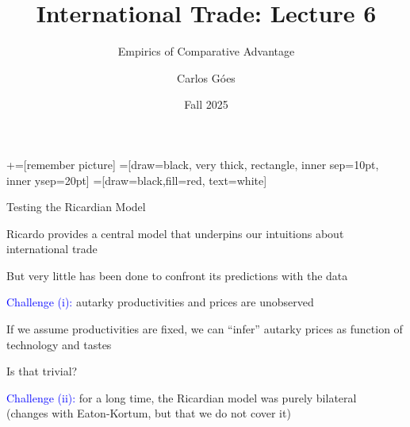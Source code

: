 \documentclass[notes,11pt, aspectratio=169, xcolor=table]{beamer}
\title[]{International Trade: Lecture 6}
\subtitle[]{Empirics of Comparative Advantage}
\author[Góes]
{Carlos Góes\inst{1}}
\date{Fall 2025}
\institute[GWU]{\inst{1} George Washington University }
\newcommand{\blue}[1]{\textcolor{blue}{#1}}
\newenvironment{wideitemize}{\itemize\addtolength{\itemsep}{10pt}}{\enditemize}
\begin{document}
\newcommand\marktopleft[1]{%
    \tikz[overlay,remember picture] 
        \node (marker-#1-a) at (-.3em,.3em) {};%
}
\newcommand\markbottomright[2]{%
    \tikz[overlay,remember picture] 
        \node (marker-#1-b) at (0em,0em) {};%
}
+=[remember picture] 
 =[draw=black, very thick, rectangle, inner sep=10pt, inner ysep=20pt]
 =[draw=black,fill=red, text=white]















\frame{\titlepage}
\addtocounter{framenumber}{-1}





\begin{frame}{Testing the Ricardian Model}
    \begin{wideitemize}
        \item Ricardo provides a central model that underpins our intuitions about international trade

        \item<2-> But very little has been done to confront its predictions with the data

        \item<3-> \blue{Challenge (i):} autarky productivities and prices are unobserved

        \item<4-> If we assume productivities are fixed, we can ``infer'' autarky prices as function of technology and tastes

        \item<5-> Is that trivial?

        \item<5-> \blue{Challenge (ii):} for a long time, the Ricardian model was purely bilateral \\ 
        \qquad (changes with Eaton-Kortum, but that we do not cover it)

    \end{wideitemize}
\end{frame}
\end{document}
